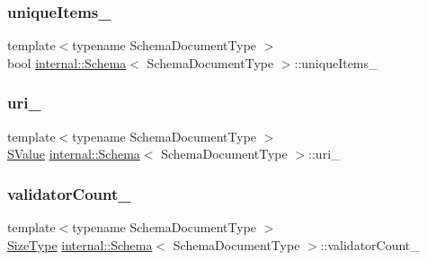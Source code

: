 \mbox{\label{classinternal_1_1Schema_a1fc820127a8aca75e2b6a9de75ed3116}} 
\subsubsection{\texorpdfstring{unique\+Items\+\_\+}{uniqueItems\_}}
{\footnotesize\ttfamily template$<$typename Schema\+Document\+Type $>$ \\
bool \hyperlink{classinternal_1_1Schema}{internal\+::\+Schema}$<$ Schema\+Document\+Type $>$\+::unique\+Items\+\_\+\hspace{0.3cm}{\ttfamily [private]}}

\mbox{\label{classinternal_1_1Schema_acbf2f4096e77de8ab7c5209771a6d04a}} 
\subsubsection{\texorpdfstring{uri\+\_\+}{uri\_}}
{\footnotesize\ttfamily template$<$typename Schema\+Document\+Type $>$ \\
\hyperlink{classinternal_1_1Schema_ab3a07540a27d4cc2b0e260290c5c5771}{S\+Value} \hyperlink{classinternal_1_1Schema}{internal\+::\+Schema}$<$ Schema\+Document\+Type $>$\+::uri\+\_\+\hspace{0.3cm}{\ttfamily [private]}}

\mbox{\label{classinternal_1_1Schema_a33da447b04096e0188476f4cf7f1585a}} 
\subsubsection{\texorpdfstring{validator\+Count\+\_\+}{validatorCount\_}}
{\footnotesize\ttfamily template$<$typename Schema\+Document\+Type $>$ \\
\hyperlink{rapidjson_8h_a5ed6e6e67250fadbd041127e6386dcb5}{Size\+Type} \hyperlink{classinternal_1_1Schema}{internal\+::\+Schema}$<$ Schema\+Document\+Type $>$\+::validator\+Count\+\_\+\hspace{0.3cm}{\ttfamily [private]}}

